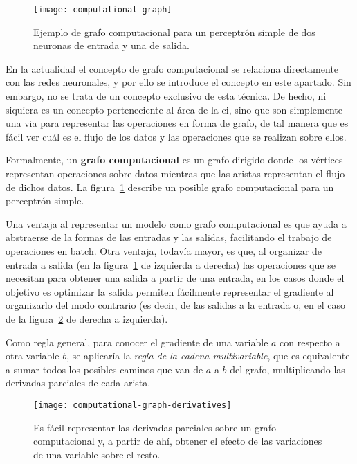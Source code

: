 \begin{figure}[!b]
	\centering
	\texttt{[image: computational-graph]}
	\caption[Ejemplo de grafo computacional]{Ejemplo de grafo computacional para un perceptrón simple de dos neuronas de entrada y una de salida.}
	\label{fig:computational-graph}
\end{figure}

En la actualidad el concepto de grafo computacional se relaciona directamente con las redes neuronales, y por ello se introduce el concepto en este apartado. Sin embargo, no se trata de un concepto exclusivo de esta técnica. De hecho, ni siquiera es un concepto perteneciente al área de la \ac{ci}, sino que son simplemente una via para representar las operaciones en forma de grafo, de tal manera que es fácil ver cuál es el flujo de los datos y las operaciones que se realizan sobre ellos.

Formalmente, un \textbf{grafo computacional} es un grafo dirigido donde los vértices representan operaciones sobre datos mientras que las aristas representan el flujo de dichos datos. La figura~\ref{fig:computational-graph} describe un posible grafo computacional para un perceptrón simple.

Una ventaja al representar un modelo como grafo computacional es que ayuda a abstraerse de la formas de las entradas y las salidas, facilitando el trabajo de operaciones en batch. Otra ventaja, todavía mayor, es que, al organizar de entrada a salida (en la figura~\ref{fig:computational-graph} de izquierda a derecha) las operaciones que se necesitan para obtener una salida a partir de una entrada, en los casos donde el objetivo es optimizar la salida permiten fácilmente representar el gradiente al organizarlo del modo contrario (es decir, de las salidas a la entrada o, en el caso de la figura~\ref{fig:computational-graph-derivatives} de derecha a izquierda).

Como regla general, para conocer el gradiente de una variable $a$ con respecto a otra variable $b$, se aplicaría la \textit{regla de la cadena multivariable}, que es equivalente a sumar todos los posibles caminos que van de $a$ a $b$ del grafo, multiplicando las derivadas parciales de cada arista.

\begin{figure}[t]
	\centering
	\texttt{[image: computational-graph-derivatives]}
	\caption[Derivadas parciales sobre un grafo computacional]{Es fácil representar las derivadas parciales sobre un grafo computacional y, a partir de ahí, obtener el efecto de las variaciones de una variable sobre el resto.}
	\label{fig:computational-graph-derivatives}
\end{figure}

